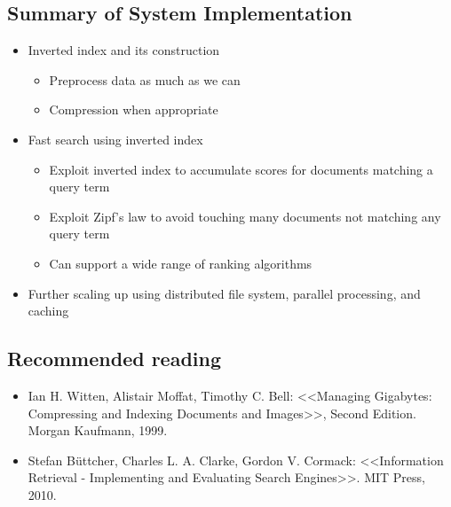 \subsection{Summary of System Implementation}
\begin{itemize}
\item Inverted index and its construction 
\begin{itemize}
\item Preprocess data as much as we can 
\item Compression when appropriate
\end{itemize}

\item Fast search using inverted index
\begin{itemize}
\item Exploit inverted index to accumulate scores for documents matching
a query term
\item Exploit Zipf’s law to avoid touching many documents not matching any query term
\item Can support a wide range of ranking algorithms
\end{itemize}

\item Further scaling up using distributed file system, parallel processing, and caching
\end{itemize}


\subsection{Recommended reading}
\begin{itemize}
\item Ian H. Witten, Alistair Moffat, Timothy C. Bell: <<Managing Gigabytes: Compressing and Indexing Documents and Images>>, Second Edition. Morgan Kaufmann, 1999.
\item Stefan B{\"u}ttcher, Charles L. A. Clarke, Gordon V. Cormack: <<Information Retrieval - Implementing and Evaluating Search Engines>>. MIT Press, 2010.
\end{itemize}
